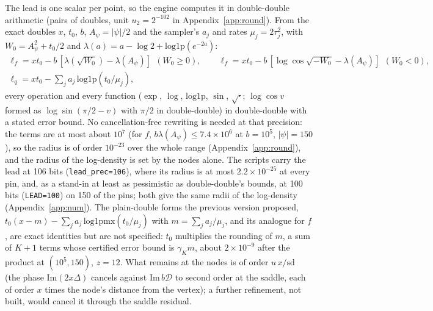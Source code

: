 The lead is one scalar per point, so the engine computes it in double-double arithmetic (pairs of doubles, unit
$u_2=2^{-102}$ in Appendix~\ref{app:round}). From the exact doubles $x$, $t_0$, $b$, $A_\psi=|\psi|/2$ and the
sampler's $a_j$ and rates $\mu_j=2\tau_j^2$, with $W_0=A_\psi^2+t_0/2$ and $\lambda(a)=a-\log2+\mathrm{log1p}(e^{-2a})$:
\begin{equation}\label{eq:lead}
\begin{gathered}
  \ell_f=xt_0-b\,[\lambda(\sqrt{W_0})-\lambda(A_\psi)]\ \ (W_0\ge0),\qquad
  \ell_f=xt_0-b\,[\log\cos\sqrt{-W_0}-\lambda(A_\psi)]\ \ (W_0<0),\\
  \ell_q=xt_0-\sum_ja_j\,\mathrm{log1p}(t_0/\mu_j),
\end{gathered}
\end{equation}
every operation and every function ($\exp$, $\log$, $\mathrm{log1p}$, $\sin$, $\sqrt{\cdot}$; $\log\cos v$ formed as
$\log\sin(\pi/2-v)$ with $\pi/2$ in double-double) in double-double with a stated error bound. No cancellation-free rewriting is needed at that precision: the terms are at most about
$10^7$ (for $f$, $b\lambda(A_\psi)\le7.4\times10^6$ at $b=10^5$, $|\psi|=150$), so the radius is of order
$10^{-23}$ over the whole range (Appendix~\ref{app:round}), and the radius of the log-density is set by the nodes
alone. The scripts carry the lead at 106 bits (\texttt{lead\_prec=106}), where its radius is at most
$2.2\times10^{-25}$ at every pin, and, as a stand-in at least as pessimistic as double-double's bounds, at 100
bits (\texttt{LEAD=100}) on 150 of the pins; both give the same radii of the log-density (Appendix~\ref{app:num}). The plain-double forms
the previous version proposed, $t_0(x-m)-\sum_ja_j\,\mathrm{log1pmx}(t_0/\mu_j)$ with $m=\sum_ja_j/\mu_j$,
and its analogue for $f$, are exact identities but are not specified: $t_0$ multiplies the rounding of $m$, a sum
of $K+1$ terms whose certified error bound is $\gamma_{K}m$, about $2\times10^{-9}$ after the product at
$(10^5,150)$, $z=12$. What remains
at the nodes is of order $u\,x/\mathrm{sd}$ (the phase $\mathrm{Im}(2x\Delta)$ cancels against $\mathrm{Im}\,
b\mathcal D$ to second order at the saddle, each of order $x$ times the node's distance from the vertex); a
further refinement, not built, would cancel it through the saddle residual.

